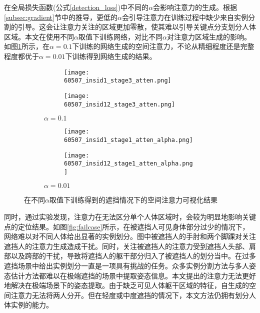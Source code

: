 在全局损失函数(公式\eqref{detection_loss})中不同的$\alpha$会影响注意力的生成。根据\ref{subsec:gradient}节中的推导，更低的$\alpha$会引导注意力在训练过程中缺少来自实例分割的引导。这会让注意力关注的区域更加零散，使其难以引导关键点分支划分人体区域。本文在使用不同$\alpha$取值下训练网络，对比不同$\alpha$对注意力区域生成的影响。如图\ref{fig:attenalpha}所示，在$\alpha=0.1$下训练的网络生成的空间注意力，不论从精细程度还是完整程度都优于$\alpha=0.01$下训练得到网络生成的结果。

\begin{figure}
	\centering
	\begin{subfigure}{0.2\textwidth}
		\centering
		\begin{subfigure}{\linewidth}
			\texttt{[image: 60507\_insid1\_stage3\_atten.png]}
		\end{subfigure}
		\vskip2pt
		\begin{subfigure}{\linewidth}
			\texttt{[image: 60507\_insid12\_stage3\_atten.png]}
		\end{subfigure}
		\caption{$\alpha=0.1$}
	\end{subfigure}
	\begin{subfigure}{0.2\textwidth}
		\centering
		\begin{subfigure}{\linewidth}
			\texttt{[image: 60507\_insid1\_stage1\_atten\_alpha.png]}
		\end{subfigure}
		\vskip2pt
		\begin{subfigure}{\linewidth}
			\texttt{[image: 60507\_insid12\_stage1\_atten\_alpha.png]}
		\end{subfigure}
		\caption{$\alpha=0.01$}
	\end{subfigure}
	\begin{minipage}{0.03\linewidth}
		
		\vskip1.5cm
	\end{minipage}
	\caption{在不同$\alpha$取值下训练得到的遮挡情况下的空间注意力可视化结果}
	\label{fig:attenalpha}
\end{figure}

同时，通过实验发现，注意力在无法区分单个人体区域时，会较为明显地影响关键点的定位结果。如图\ref{fig:failcase}所示，在被遮挡人可见身体部分过少的情况下，网络难以对不同人体给出显著的实例划分。图中被遮挡人的手肘和两个脚踝对关注遮挡人的注意力生成造成干扰。同时，关注被遮挡人的注意力受到遮挡人头部、肩部以及跨部的干扰，导致将遮挡人的躯干部分归入了被遮挡人的划分当中。在过多遮挡场景中给出实例划分一直是一项具有挑战的任务。众多实例分割方法与多人姿态估计方法都难以在极端遮挡的场景中提取姿态信息。本文提出的注意力无法更好地解决在极端场景下的姿态提取。由于缺乏可见人体躯干区域的特征，自生成的空间注意力无法将两人分开。但在轻度或中度遮挡的情况下，本文方法仍拥有划分人体实例的能力。

